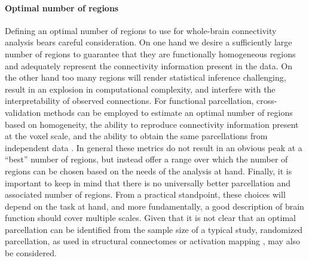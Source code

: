 \documentclass[5p]{elsarticle}
\begin{document}
\paragraph{Optimal number of regions}
%
Defining an optimal number of regions to use for whole-brain connectivity analysis bears
careful consideration. On one hand we desire a sufficiently large number of
regions to guarantee that they are functionally homogeneous regions and adequately 
represent the connectivity information present in the data. On the other hand
too many regions will render statistical inference challenging, 
result in an explosion in computational complexity,
and interfere with the interpretability of observed connections. For functional
parcellation, cross-validation methods can be employed to estimate an optimal 
number of regions based on homogeneity, the ability to reproduce 
connectivity information present at the voxel scale, and the ability to
obtain the same parcellations from independent data 
\cite{craddock2012, blumensath2012}. In general these metrics do not result in an
obvious peak at a ``best'' number of regions, but instead offer a range over
which the number of regions can be chosen based on the needs of the analysis at
hand. Finally, it is important to keep in mind that there is no
universally better parcellation and associated number of regions. From a
practical standpoint, these choices will depend on the task at hand, and
more fundamentally, a good description of brain function should cover
multiple scales. Given that it is not clear that an optimal parcellation
can be identified from the sample size of a typical study, randomized
parcellation, as used in structural connectomes \cite{zalesky2010a} or
activation mapping \cite{varoquaux2012a}, may also be considered.
\end{document}
